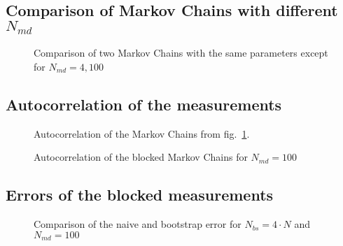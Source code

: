 \documentclass{scrartcl}
\begin{document}
\subsection{Comparison of Markov Chains with different $N_{md}$}

\begin{figure}[htbp]
	
	\caption{Comparison of two Markov Chains with the same parameters except for $N_{md}=4, 100$}
	\label{fig:markovchaincomparison}
\end{figure}



\subsection{Autocorrelation of the measurements}


\begin{figure}[htbp]
	
	\caption{Autocorrelation of the Markov Chains from fig.~\ref{fig:markovchaincomparison}.}
	\label{fig:simplecorrelation}
\end{figure}

%	

\begin{figure}[htbp]
	
	\caption{Autocorrelation of the blocked Markov Chains for $N_{md}=100$}
	\label{fig:correlationbinnmd100}
\end{figure}

%
%	

\subsection{Errors of the blocked measurements}

\begin{figure}[htbp]
	
	\caption{Comparison of the naive and bootstrap error for $N_{bs}=4\cdot N$ and $N_{md}=100$}
	\label{fig:errorbinnedcompare}
\end{figure}
\end{document}
